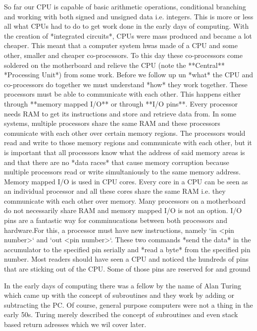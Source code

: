 So far our CPU is capable of basic arithmetic operations, conditional branching and working with
both signed and unsigned data i.e. integers. This is more or less all what CPUs had to do to get work
done in the early days of computing. With the creation of *integrated circuits*, CPUs were mass 
produced and became a lot cheaper. This meant that a computer system hwas made of a CPU and some
other, smaller and cheaper co-processors. To this day these co-processors come soldered on the
motherboard and relieve the CPU (note the **Central** *Processing Unit*) from some work. Before we
follow up un *what* the CPU and co-processors do together we must understand *how* they work together.
These processors must be able to communicate with each other. This happens either through
**memory mapped I/O** or through **I/O pins**. Every processor needs RAM to get its instructions and
store and retrieve data from. In some systems, multiple processors share the same RAM and these 
processors comunicate with each other over certain memory regions. The processors would read and 
write to those memory regions and communicate with each other, but it is important that all processors
know what the address of said memory areas is and that there are no *data races* that cause memory
corruption because multiple processors read or write simultaniously to the same memory address. 
Memory mapped I/O is used in CPU cores. Every core in a CPU can be seen as an individual processor
and all these cores share the same RAM i.e. they communicate with each other over memory. 
Many processors on a motherboard do not necessarily share RAM and memory mapped I/O is not an option.
I/O pins are a fantastic way for comminucations between both processors and hardware.For this, a
processor must have new instructions, namely `in <pin number>` and `out <pin number>`. These two 
commands *send the data* in the accumulator to the specified pin serially and *read a byte* from the 
specified pin number. Most readers should have seen a CPU and noticed the hundreds of pins that are
sticking out of the CPU. Some of those pins are reserved for and ground


In the early days of computing there was a fellow by the name of Alan Turing which came up with the concept of subroutines and they work by adding or subtracting the PC. Of course, general purpose
computers were not a thing in the early 50s. Turing merely described the concept of subroutines
and even stack based return adresses which we wil cover later.
